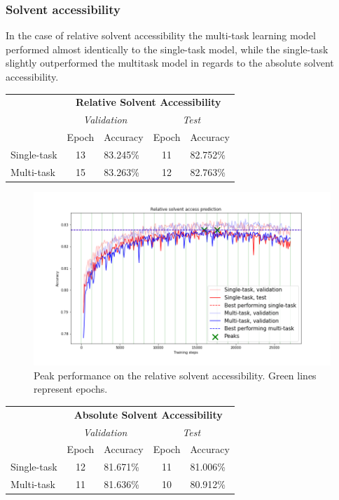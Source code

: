 \subsubsection{Solvent accessibility}
In the case of relative solvent accessibility the multi-task learning model performed almost identically to the single-task model, while the single-task slightly outperformed the multitask model in regards to the absolute solvent accessibility.

\begin{table}[h]
\centering
\begin{tabular}{lclcl}
 & \multicolumn{4}{c}{\textbf{Relative Solvent Accessibility}} \\
 & \multicolumn{2}{c|}{\textit{Validation}} & \multicolumn{2}{c}{\textit{Test}} \\ \cline{2-5} 
 & \multicolumn{1}{l}{Epoch} & \multicolumn{1}{l|}{Accuracy} & \multicolumn{1}{l}{Epoch} & Accuracy \\
Single-task & 13 & \multicolumn{1}{l|}{83.245\%} & 11 & 82.752\% \\
Multi-task & 15 & \multicolumn{1}{l|}{83.263\%} & 12 & 82.763\%
\end{tabular}
\end{table}

\begin{figure}[H]
  \centering
  \includegraphics[width=\linewidth]{../graphs/final/rel_final_small}
  \caption{Peak performance on the relative solvent accessibility. Green lines represent epochs.}
\end{figure}

\begin{table}[h]
\centering
\begin{tabular}{lclcl}
 & \multicolumn{4}{c}{\textbf{Absolute Solvent Accessibility}} \\
 & \multicolumn{2}{c|}{\textit{Validation}} & \multicolumn{2}{c}{\textit{Test}} \\ \cline{2-5} 
 & \multicolumn{1}{l}{Epoch} & \multicolumn{1}{l|}{Accuracy} & \multicolumn{1}{l}{Epoch} & Accuracy \\
Single-task & 12 & \multicolumn{1}{l|}{81.671\%} & 11 & 81.006\% \\
Multi-task & 11 & \multicolumn{1}{l|}{81.636\%} & 10 & 80.912\%
\end{tabular}
\end{table}

